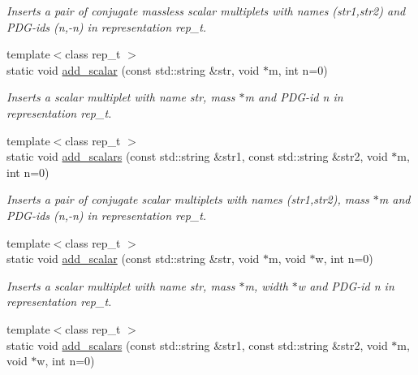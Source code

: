 \begin{DoxyCompactItemize}
\begin{DoxyCompactList}\small\item\em Inserts a pair of conjugate massless scalar multiplets with names (str1,str2) and P\-D\-G-\/ids (n,-\/n) in representation rep\-\_\-t. \end{DoxyCompactList}\item 
\hypertarget{a00370_a629a83856e1021fec02e12b01d6a7342}{{\footnotesize template$<$class rep\-\_\-t $>$ }\\static void \hyperlink{a00370_a629a83856e1021fec02e12b01d6a7342}{add\-\_\-scalar} (const std\-::string \&str, void $\ast$m, int n=0)}\label{a00370_a629a83856e1021fec02e12b01d6a7342}

\begin{DoxyCompactList}\small\item\em Inserts a scalar multiplet with name str, mass $\ast$m and P\-D\-G-\/id n in representation rep\-\_\-t. \end{DoxyCompactList}\item 
\hypertarget{a00370_a7e6c0da84c3155c80e37199817fd4a8d}{{\footnotesize template$<$class rep\-\_\-t $>$ }\\static void \hyperlink{a00370_a7e6c0da84c3155c80e37199817fd4a8d}{add\-\_\-scalars} (const std\-::string \&str1, const std\-::string \&str2, void $\ast$m, int n=0)}\label{a00370_a7e6c0da84c3155c80e37199817fd4a8d}

\begin{DoxyCompactList}\small\item\em Inserts a pair of conjugate scalar multiplets with names (str1,str2), mass $\ast$m and P\-D\-G-\/ids (n,-\/n) in representation rep\-\_\-t. \end{DoxyCompactList}\item 
\hypertarget{a00370_a97c2aafa864d22447b142020a05ad9ff}{{\footnotesize template$<$class rep\-\_\-t $>$ }\\static void \hyperlink{a00370_a97c2aafa864d22447b142020a05ad9ff}{add\-\_\-scalar} (const std\-::string \&str, void $\ast$m, void $\ast$w, int n=0)}\label{a00370_a97c2aafa864d22447b142020a05ad9ff}

\begin{DoxyCompactList}\small\item\em Inserts a scalar multiplet with name str, mass $\ast$m, width $\ast$w and P\-D\-G-\/id n in representation rep\-\_\-t. \end{DoxyCompactList}\item 
\hypertarget{a00370_af96849646b9097e3677961af7787811e}{{\footnotesize template$<$class rep\-\_\-t $>$ }\\static void \hyperlink{a00370_af96849646b9097e3677961af7787811e}{add\-\_\-scalars} (const std\-::string \&str1, const std\-::string \&str2, void $\ast$m, void $\ast$w, int n=0)}\label{a00370_af96849646b9097e3677961af7787811e}


\end{DoxyCompactItemize}
